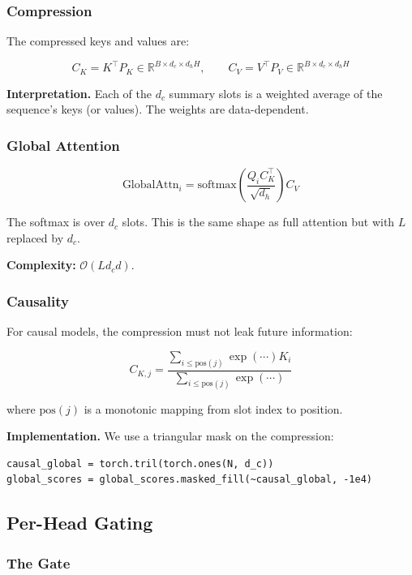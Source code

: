 \subsubsection{Compression}

The compressed keys and values are:

\[
C_K = K^\top P_K \in \mathbb{R}^{B \times d_c \times d_h H}, \qquad
C_V = V^\top P_V \in \mathbb{R}^{B \times d_c \times d_h H}
\]

\textbf{Interpretation.} Each of the $d_c$ summary slots is a weighted average of 
the sequence's keys (or values). The weights are data-dependent.

\subsubsection{Global Attention}

\[
\text{GlobalAttn}_i = \text{softmax}\!\left(\frac{Q_i C_K^\top}{\sqrt{d_h}}\right) C_V
\]

The softmax is over $d_c$ slots. This is the same shape as full attention 
but with $L$ replaced by $d_c$.

\textbf{Complexity:} $\mathcal{O}(L d_c d)$.

\subsubsection{Causality}

For causal models, the compression must not leak future information:

\[
C_{K, j} = \frac{\sum_{i \leq \text{pos}(j)} \exp(\cdots) K_i}{\sum_{i \leq \text{pos}(j)} \exp(\cdots)}
\]

where $\text{pos}(j)$ is a monotonic mapping from slot index to position.

\textbf{Implementation.} We use a triangular mask on the compression:

\begin{lstlisting}
causal_global = torch.tril(torch.ones(N, d_c))
global_scores = global_scores.masked_fill(~causal_global, -1e4)
\end{lstlisting}

\subsection{Per-Head Gating}

\subsubsection{The Gate}

